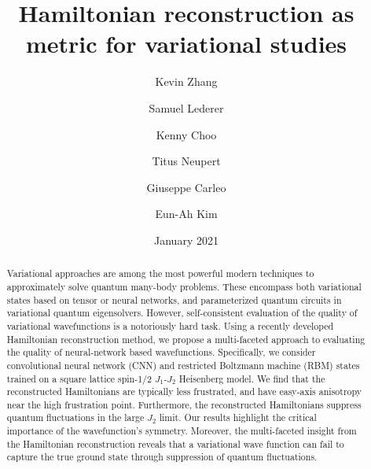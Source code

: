 \documentclass[amsmath,amssymb,aps,prl,superscriptaddress,twocolumn,floatfix]{revtex4}
\begin{document}
\title{Hamiltonian reconstruction as metric for  variational studies}
\author{Kevin Zhang}
\author{Samuel Lederer}
\author{Kenny Choo}
\author{Titus Neupert}
\author{Giuseppe Carleo}
\author{Eun-Ah Kim}

\date{January 2021}

\begin{abstract}
Variational approaches are among the most powerful modern techniques to approximately solve quantum many-body problems. These encompass both  variational states based on tensor or neural networks, and parameterized quantum circuits in variational quantum eigensolvers. However, self-consistent evaluation of the quality of variational wavefunctions is a notoriously hard task. 
 Using a recently developed Hamiltonian reconstruction method, we propose a multi-faceted approach to evaluating the quality of neural-network based wavefunctions. 
 Specifically, we consider convolutional neural network (CNN) and restricted Boltzmann machine (RBM) states trained on a square lattice spin-1/2 $J_1$-$J_2$ Heisenberg model.
 We find that the reconstructed Hamiltonians are typically less frustrated, and have easy-axis anisotropy near the high frustration point. Furthermore, the reconstructed Hamiltonians suppress quantum fluctuations in the large $J_2$ limit. Our results highlight the critical importance of the wavefunction's symmetry. Moreover,
 the multi-faceted insight from the Hamiltonian reconstruction reveals that a variational wave function can fail to capture the true ground state through suppression of quantum fluctuations. 

\end{abstract}



\maketitle
\end{document}
